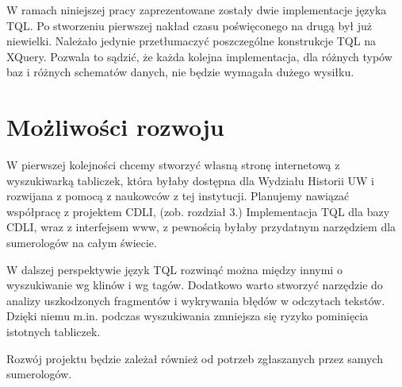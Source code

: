 W ramach niniejszej pracy zaprezentowane zostały dwie implementacje języka TQL. Po stworzeniu pierwszej nakład czasu poświęconego na drugą był już niewielki. Należało jedynie przetłumaczyć poszczególne konstrukcje TQL na XQuery. Pozwala to sądzić, że każda kolejna implementacja, dla różnych typów baz i różnych schematów danych, nie będzie wymagała dużego wysiłku. 



\section*{Możliwości rozwoju}

W pierwszej kolejności chcemy stworzyć własną stronę internetową z wyszukiwarką tabliczek, która byłaby dostępna dla Wydziału Historii UW i rozwijana z pomocą z naukowców z tej instytucji. Planujemy nawiązać współpracę z projektem CDLI, (zob. rozdział 3.) Implementacja TQL dla bazy CDLI, wraz z interfejsem www, z pewnością byłaby przydatnym narzędziem dla sumerologów na całym świecie.

W dalszej perspektywie język TQL rozwinąć można między innymi o wyszukiwanie wg klinów i wg tagów. Dodatkowo warto stworzyć narzędzie do analizy uszkodzonych fragmentów i wykrywania błędów w odczytach tekstów. Dzięki niemu m.in. podczas wyszukiwania  zmniejsza się ryzyko pominięcia istotnych tabliczek. 

Rozwój projektu będzie zależał również od potrzeb zgłaszanych przez samych sumerologów.







%
%
%
